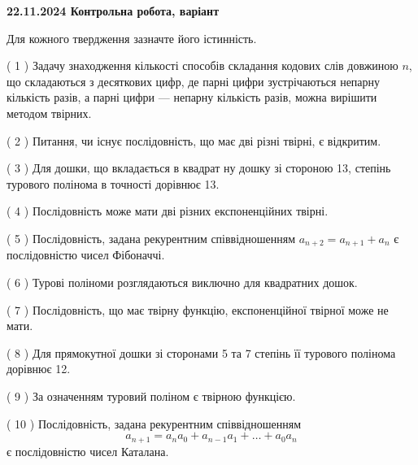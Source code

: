 \documentclass[12pt, ukrainian]{article}
\begin{document}
\vspace{4mm}
\newpage
\begin {large}

\textbf{22.11.2024 Контрольна робота, варіант  }\par


{
Для кожного твердження зазначте його істинність.\par
\vspace{2mm}
( 1 ) Задачу знаходження кількості способів складання кодових слів довжиною $n$, що складаються з десяткових цифр, де парні цифри зустрічаються непарну кількість разів, а парні цифри — непарну кількість разів, можна вирішити методом твірних.%

( 2 ) Питання, чи існує послідовність, що має дві різні твірні, є відкритим.%

( 3 ) Для дошки, що вкладається в квадрат ну дошку зі стороною 13, степінь турового полінома в точності дорівнює 13.%

( 4 ) Послідовність може мати дві різних експоненційних твірні.%

( 5 ) Послідовність, задана рекурентним співвідношенням $a_{n+2}=a_{n+1}+a_{n}$ є послідовністю чисел Фібоначчі.%

( 6 ) Турові поліноми розглядаються виключно для квадратних дошок.%

( 7 ) Послідовність, що має твірну функцію, експоненційної твірної може не мати.%

( 8 ) Для прямокутної дошки зі сторонами 5 та 7 степінь її турового полінома дорівнює 12.%

( 9 ) За означенням туровий поліном є твірною функцією.%

( 10 ) Послідовність, задана рекурентним співвідношенням $$a_{n+1}=a_{n}a_{0}+a_{n-1}a_{1}+\ldots+a_0a_{n}$$ є послідовністю чисел Каталана.%


\vspace{5mm}
}
\end {large}
\end{document}
